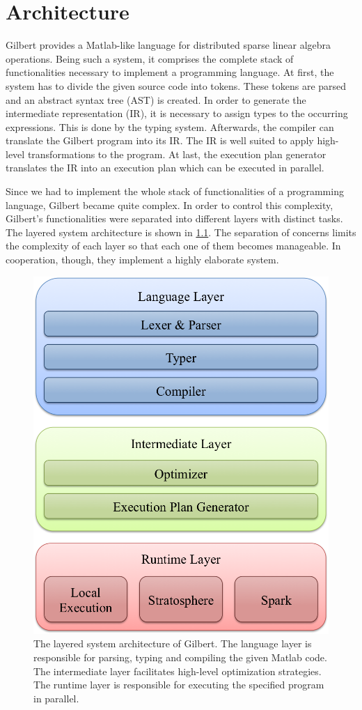 \chapter{Architecture}
\label{cha:architecture}


Gilbert provides a Matlab-like language for distributed sparse linear algebra operations.
Being such a system, it comprises the complete stack of functionalities necessary to implement a programming language.
At first, the system has to divide the given source code into tokens.
These tokens are parsed and an abstract syntax tree (AST) is created.
In order to generate the intermediate representation (IR), it is necessary to assign types to the occurring expressions.
This is done by the typing system.
Afterwards, the compiler can translate the Gilbert program into its IR.
The IR is well suited to apply high-level transformations to the program.
At last, the execution plan generator translates the IR into an execution plan which can be executed in parallel.

Since we had to implement the whole stack of functionalities of a programming language, Gilbert became quite complex.
In order to control this complexity, Gilbert's functionalities were separated into different layers with distinct tasks.
The layered system architecture is shown in \cref{fig:systemArchitecture}.
The separation of concerns limits the complexity of each layer so that each one of them becomes manageable.
In cooperation, though, they implement a highly elaborate system.

\begin{figure}
	\centering
	\includegraphics[width=0.5\linewidth]{images/systemArchitecture.png}
	\caption{The layered system architecture of Gilbert. The language layer is responsible for parsing, typing and compiling the given Matlab code. The intermediate layer facilitates high-level optimization strategies. The runtime layer is responsible for executing the specified program in parallel.}
	\label{fig:systemArchitecture}
\end{figure}

